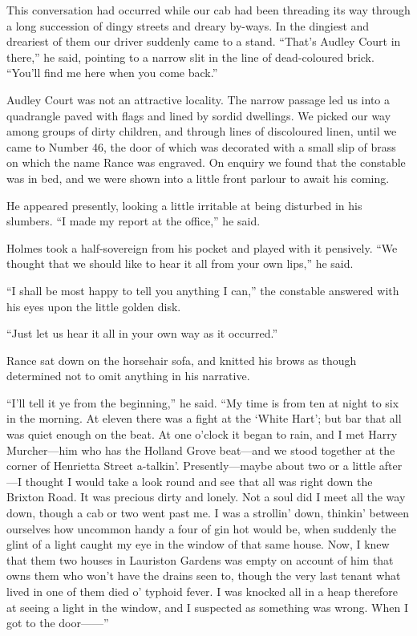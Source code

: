 \documentclass[12pt]{book}
\begin{document}
This conversation had occurred while our cab had been threading its way through a long succession of dingy streets and dreary by-ways. In the dingiest and dreariest of them our driver suddenly came to a stand. “That’s Audley Court in there,” he said, pointing to a narrow slit in the line of dead-coloured brick. “You’ll find me here when you come back.” 

Audley Court was not an attractive locality. The narrow passage led us into a quadrangle paved with flags and lined by sordid dwellings. We picked our way among groups of dirty children, and through lines of discoloured linen, until we came to Number 46, the door of which was decorated with a small slip of brass on which the name Rance was engraved. On enquiry we found that the constable was in bed, and we were shown into a little front parlour to await his coming. 

He appeared presently, looking a little irritable at being disturbed in his slumbers. “I made my report at the office,” he said. 

Holmes took a half-sovereign from his pocket and played with it pensively. “We thought that we should like to hear it all from your own lips,” he said. 

“I shall be most happy to tell you anything I can,” the constable answered with his eyes upon the little golden disk. 

“Just let us hear it all in your own way as it occurred.” 

Rance sat down on the horsehair sofa, and knitted his brows as though determined not to omit anything in his narrative. 

“I’ll tell it ye from the beginning,” he said. “My time is from ten at night to six in the morning. At eleven there was a fight at the ‘White Hart’; but bar that all was quiet enough on the beat. At one o’clock it began to rain, and I met Harry Murcher—him who has the Holland Grove beat—and we stood together at the corner of Henrietta Street a-talkin’. Presently—maybe about two or a little after—I thought I would take a look round and see that all was right down the Brixton Road. It was precious dirty and lonely. Not a soul did I meet all the way down, though a cab or two went past me. I was a strollin’ down, thinkin’ between ourselves how uncommon handy a four of gin hot would be, when suddenly the glint of a light caught my eye in the window of that same house. Now, I knew that them two houses in Lauriston Gardens was empty on account of him that owns them who won’t have the drains seen to, though the very last tenant what lived in one of them died o’ typhoid fever. I was knocked all in a heap therefore at seeing a light in the window, and I suspected as something was wrong. When I got to the door——” 
\end{document}
